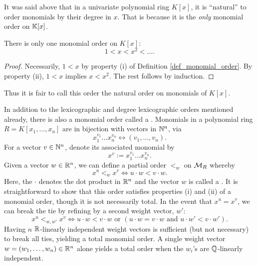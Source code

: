 It was said above that in a univariate polynomial ring $K[x]$,
it is ``natural'' to order monomials by their degree in $x$.
That is because it is the \emph{only} monomial order on $\bb K[x]$.
\begin{proposition}
  There is only one monomial order on $K[x]$:
  \[ 1 < x < x^2 < \dots. \]
\end{proposition}
\begin{proof}
\begin{comment}
  Let $(\cal M, \leq)$ be a monomial order on powers of $x$.
  We show by induction that $x^n < x^{n+1}$ for all natural numbers $n$.

  By property (i), $1 < x$, establishing the base case, $x^0 < x^1$.
  Now suppose $x^k < x^{k+1}$ for some natural number $k \geq 0$.
  By property (ii), $x^kx < x^{k+1}x$, hence $x^{k+1} < x^{k+2}$.
\end{comment}
  Necessarily, $1 < x$ by property (i) of Definition \ref{def_monomial_order}.
  By property (ii), $1 < x$ implies $x < x^2$. The rest follows by induction.
\end{proof}
Thus it is fair to call this order the natural order on monomials of $K[x]$.

In addition to the lexicographic and degree lexicographic orders mentioned already,
there is also a monomial order called a .
Monomials in a polynomial ring $R = K[x_1, \ldots, x_n]$ are in bijection with vectors in $\bb N^n$, via
\[ x_1^{v_1} \dots x_n^{v_n} \longleftrightarrow (v_1, \ldots, v_n). \]
For a vector $v \in \bb N^n$, denote its associated monomial by 
\[ x^v := x_1^{v_1} \dots x_n^{v_n}. \]
Given a vector $w \in \bb R^n$, we can define a partial order $<_w$ on $\cal M_R$ whereby
\[ x^u <_w x^v \iff u \cdot w < v \cdot w. \]
Here, the $\cdot$ denotes the dot product in $\bb R^n$ and the vector $w$ is called a .
It is straightforward to show that this order satisfies properties (i) and (ii) of a monomial order, though it is not necessarily total.
In the event that $x^u = x^v$, we can break the tie by refining by a second weight vector, $w'$:
\[ x^u <_{w,w'} x^v \iff u \cdot w < v \cdot w \text{ or }(u \cdot w = v \cdot w \text{ and } u \cdot w' < v \cdot w'). \]
Having $n$ $\bb R$-linearly independent weight vectors is sufficient (but not necessary) to break all ties, yielding a total monomial order.
A single weight vector $w = (w_1, \ldots, w_n) \in \bb R^n$ alone yields a total order when the $w_i$'s are $\bb Q$-linearly independent. 

